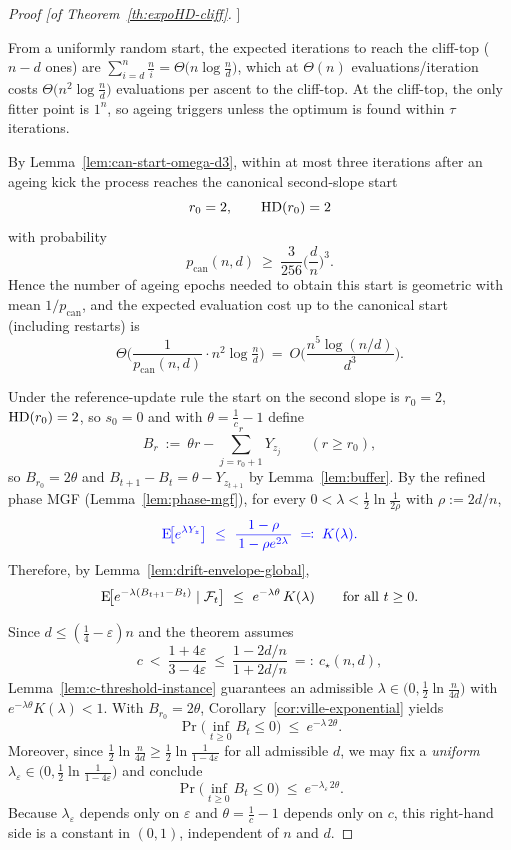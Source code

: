 \begin{proof}[Proof [of Theorem~\ref{th:expoHD-cliff}]]
	
	From a uniformly random start, the expected iterations to reach the cliff-top ($n-d$ ones) are
	$\sum_{i=d}^{n}\frac{n}{i}=\Theta\!\big(n\log\tfrac{n}{d}\big)$, which at $\Theta(n)$ evaluations/iteration costs
	$\Theta\!\big(n^{2}\log\tfrac{n}{d}\big)$ evaluations per ascent to the cliff-top. At the cliff-top, the only fitter point is $1^n$, so ageing triggers unless the optimum is found within $\tau$ iterations.
	
	By Lemma~\ref{lem:can-start-omega-d3}, within at most three iterations after an ageing kick the process reaches the canonical second-slope start
	\[
	r_0=2,\qquad \text{HD}(r_0)=2
	\]
	with probability
	\[
	p_{\mathrm{can}}(n,d)\ \ge\ \frac{3}{256}\Big(\frac{d}{n}\Big)^{\!3}.
	\]
	Hence the number of ageing epochs needed to obtain this start is geometric with mean $1/p_{\mathrm{can}}$, and the expected evaluation cost up to the canonical start (including restarts) is
	\[
	\Theta\!\Big(\frac{1}{p_{\mathrm{can}}(n,d)}\cdot n^{2}\log\tfrac{n}{d}\Big)
	\ =\ O\!\Big(\frac{n^{5}\log(n/d)}{d^{3}}\Big).
	\]
	
	\smallskip
	Under the reference-update rule the start on the second slope is $r_0=2$, $\text{HD}(r_0)=2$, so $s_0=0$ and with $\theta=\tfrac1c-1$ define
	\[
	B_r\ :=\ \theta r - \sum_{j=r_0+1}^{r} Y_{z_j}\qquad(r\ge r_0),
	\]
	so $B_{r_0}=2\theta$ and $B_{t+1}-B_t=\theta-Y_{z_{t+1}}$ by Lemma~\ref{lem:buffer}.
	By the refined phase MGF (Lemma~\ref{lem:phase-mgf}), for every $0<\lambda<\tfrac12\ln\!\tfrac{1}{2\rho}$ with $\rho:=2d/n$,
	\[
	\textcolor{blue}{\text{E}\!\big[e^{\lambda Y_z}\big]\ \le\ \frac{1-\rho}{\,1-\rho e^{2\lambda}\,} \;\eqqcolon\; K(\lambda).}
	\]
	Therefore, by Lemma~\ref{lem:drift-envelope-global},
	\[
	\text{E}\!\big[e^{-\lambda(B_{t+1}-B_t)}\mid\mathcal F_t\big]\ \le\ e^{-\lambda\theta}\,K(\lambda)\qquad\text{for all }t\ge 0.
	\]
	
	Since $d\le(\tfrac14-\varepsilon)n$ and the theorem assumes
	\[
	c\ <\ \frac{1+4\varepsilon}{3-4\varepsilon}\ \le\ \frac{1-2d/n}{1+2d/n}\ =:\ c_\star(n,d),
	\]
	Lemma~\ref{lem:c-threshold-instance} guarantees an admissible $\lambda\in\big(0,\tfrac12\ln\tfrac{n}{4d}\big)$ with $e^{-\lambda\theta}K(\lambda)<1$.
	With $B_{r_0}=2\theta$, Corollary~\ref{cor:ville-exponential} yields
	\[
	\Pr\!\Big(\inf_{t\ge 0} B_t\le 0\Big)\ \le\ e^{-\lambda\,2\theta}.
	\]
	Moreover, since $\tfrac12\ln\!\tfrac{n}{4d}\ge \tfrac12\ln\!\tfrac{1}{1-4\varepsilon}$ for all admissible $d$, we may fix a \emph{uniform} $\lambda_\varepsilon\in\big(0,\tfrac12\ln\tfrac{1}{1-4\varepsilon}\big)$ and conclude
	\[
	\Pr\!\Big(\inf_{t\ge 0} B_t\le 0\Big)\ \le\ e^{-\lambda_\varepsilon\,2\theta}.
	\]
	Because $\lambda_\varepsilon$ depends only on $\varepsilon$ and $\theta=\tfrac1c-1$ depends only on $c$, this right-hand side is a constant in $(0,1)$, independent of $n$ and $d$.
	

\end{proof}
